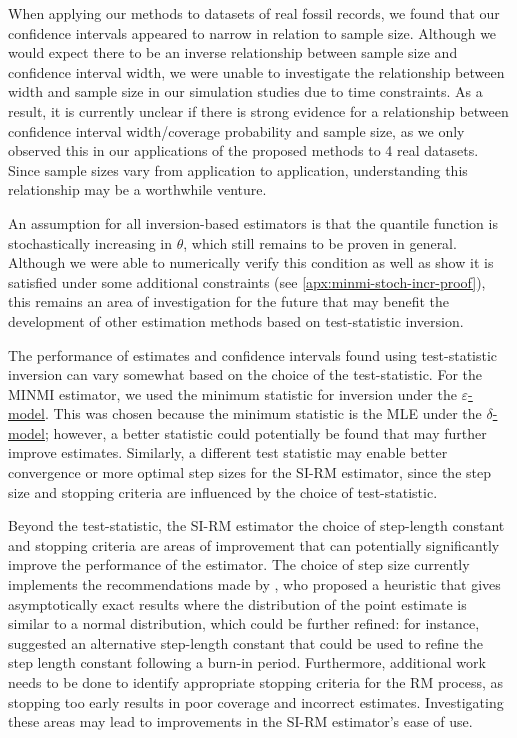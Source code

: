 When applying our methods to datasets of real fossil records, we found that our confidence intervals appeared to narrow in relation to sample size. Although we would expect there to be an inverse relationship between sample size and confidence interval width, we were unable to investigate the relationship between width and sample size in our simulation studies due to time constraints. As a result, it is currently unclear if there is strong evidence for a relationship between confidence interval width/coverage probability and sample size, as we only observed this in our applications of the proposed methods to 4 real datasets. Since sample sizes vary from application to application, understanding this relationship may be a worthwhile venture.

An assumption for all inversion-based estimators is that the quantile function is stochastically increasing in $\theta$, which still remains to be proven in general. Although we were able to numerically verify this condition as well as show it is satisfied under some additional constraints (see \autoref{apx:minmi-stoch-incr-proof}), this remains an area of investigation for the future that may benefit the development of other estimation methods based on test-statistic inversion.

The performance of estimates and confidence intervals found using test-statistic inversion can vary somewhat based on the choice of the test-statistic. For the MINMI estimator, we used the minimum statistic for inversion under the \hyperref[model: measurement-error]{$\varepsilon$-model}. This was chosen because the minimum statistic is the MLE under the \hyperref[model: no-measurement-error]{$\delta$-model}; however, a better statistic could potentially be found that may further improve estimates. Similarly, a different test statistic may enable better convergence or more optimal step sizes for the SI-RM estimator, since the step size and stopping criteria are influenced by the choice of test-statistic.

Beyond the test-statistic, the SI-RM estimator the choice of step-length constant and stopping criteria are areas of improvement that can potentially significantly improve the performance of the estimator. The choice of step size currently implements the recommendations made by \citet{Garthwaite1992}, who proposed a heuristic that gives asymptotically exact results where the distribution of the point estimate is similar to a normal distribution, which could be further refined: for instance, \citet{LlyodBotev2015} suggested an alternative step-length constant that could be used to refine the step length constant following a burn-in period. Furthermore, additional work needs to be done to identify appropriate stopping criteria for the RM process, as stopping too early results in poor coverage and incorrect estimates. Investigating these areas may lead to improvements in the SI-RM estimator's ease of use.

